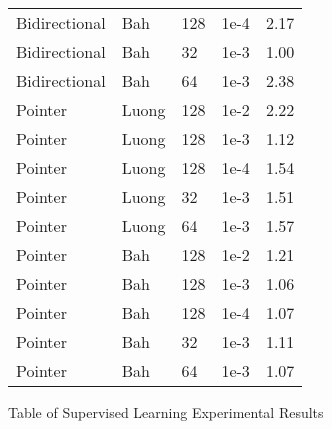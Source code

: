 \documentclass[12pt]{article}
\begin{document}
\begin{figure}[!p]
\begin{tabular}{l|l|l|l|r}
    Bidirectional & Bah & 128 & 1e-4 & 2.17\\
    Bidirectional & Bah & 32 & 1e-3 & 1.00\\
    Bidirectional & Bah & 64 & 1e-3 & 2.38\\
    Pointer & Luong & 128 & 1e-2 & 2.22\\
    Pointer & Luong & 128 & 1e-3 & 1.12\\
    Pointer & Luong & 128 & 1e-4 & 1.54\\
    Pointer & Luong & 32 & 1e-3 & 1.51\\
    Pointer & Luong & 64 & 1e-3 & 1.57\\
    Pointer & Bah & 128 & 1e-2 & 1.21\\
    Pointer & Bah & 128 & 1e-3 & 1.06\\ %
    Pointer & Bah & 128 & 1e-4 & 1.07\\
    Pointer & Bah & 32 & 1e-3 & 1.11\\
    Pointer & Bah & 64 & 1e-3 & 1.07
   \end{tabular}
  \caption{Table of Supervised Learning Experimental Results}
  \label{fig_sl_table}
\end{figure}
\end{document}
